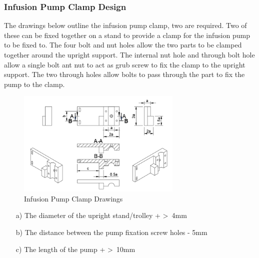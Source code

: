 \subsubsection{Infusion Pump Clamp Design}

The drawings below outline the infusion pump clamp, two are required. Two of these can be fixed together on a stand to provide a clamp for the infusion pump to be fixed to. 
The four bolt and nut holes allow the two parts to be clamped together around the upright support. The internal nut hole and through bolt hole allow a single bolt ant nut to act as grub screw to fix the clamp to the upright support. The two through holes allow bolts to pass through the part to fix the pump to the clamp.


\begin{figure}[h]
    \centering
    \includegraphics[width=0.7\textwidth]{Figures/SupportDrawings/inf_pump_clamp_drawing.png}
    \caption{Infusion Pump Clamp Drawings}
    \label{fig:infpumpclampdrawing}
  \end{figure}

\begin{enumerate}
  \item[a)]	The diameter of the upright stand/trolley + \textgreater\ 4mm
  \item[b)]	The distance between the pump fixation screw holes - 5mm
  \item[c)]	The length of the pump + \textgreater\ 10mm
\end{enumerate}

